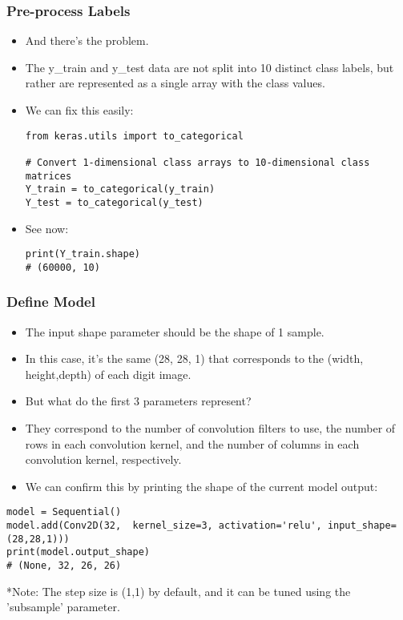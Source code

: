 \begin{frame}[fragile] \frametitle{Pre-process Labels}

\begin{itemize}
\item And there's the problem. 
\item The y\_train and y\_test data are not split into 10 distinct class labels, but rather are represented as a single array with the class values.
\item We can fix this easily:
\begin{lstlisting}
from keras.utils import to_categorical

# Convert 1-dimensional class arrays to 10-dimensional class matrices
Y_train = to_categorical(y_train)
Y_test = to_categorical(y_test)
\end{lstlisting}
\item See now:
\begin{lstlisting}
print(Y_train.shape)
# (60000, 10)
\end{lstlisting}
\end{itemize}
\end{frame}


\begin{frame}[fragile] \frametitle{Define Model}

\begin{itemize}
\item The input shape parameter should be the shape of 1 sample. 
\item In this case, it's the same (28, 28, 1) that corresponds to  the (width, height,depth) of each digit image.
\item But what do the first 3 parameters represent? 
\item They correspond to the number of convolution filters to use, the number of rows in each convolution kernel, and the number of columns in each convolution kernel, respectively.
\item We can confirm this by printing the shape of the current model output:
\end{itemize}
\begin{lstlisting}
model = Sequential()
model.add(Conv2D(32,  kernel_size=3, activation='relu', input_shape=(28,28,1)))
print(model.output_shape)
# (None, 32, 26, 26)
\end{lstlisting}
*Note: The step size is (1,1) by default, and it can be tuned using the 'subsample' parameter.
\end{frame}




